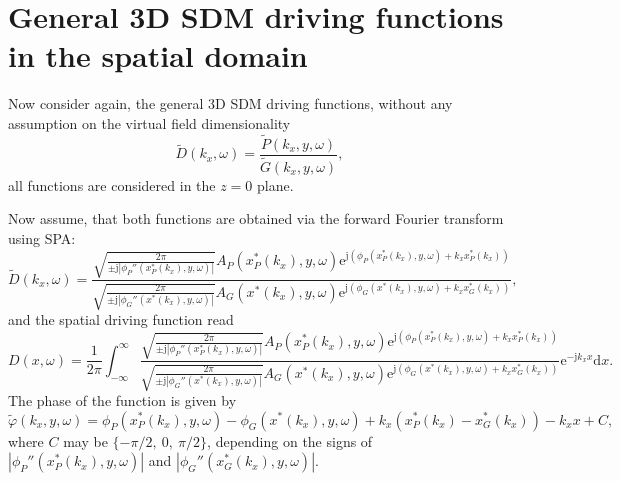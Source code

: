 \documentclass[12pt,a4paper]{article}
\newcommand{\td}{\mathrm{d}}
\newcommand{\te}{\mathrm{e}}
\newcommand{\ti}{\mathrm{j}}
\begin{document}
\section{General 3D SDM driving functions in the spatial domain}

Now consider again, the general 3D SDM driving functions, without any assumption on the virtual field dimensionality
\begin{equation}
\tilde{D}(k_x,\omega) = \frac{\tilde{P}(k_x,y,\omega)}{\tilde{G}(k_x,y,\omega)},
\end{equation}
all functions are considered in the $z=0$ plane.

Now assume, that both functions are obtained via the forward Fourier transform using SPA:
\begin{equation}
\tilde{D}(k_x,\omega) = 
\frac{
\sqrt{\frac{2\pi}{\pm \ti \left|\phi_P''(x_P^*(k_x),y,\omega) \right|}} A_P(x_P^*(k_x),y,\omega) \te^{\ti (\phi_P(x_P^*(k_x),y,\omega)+k_x x_P^*(k_x)) }
}{
\sqrt{\frac{2\pi}{\pm \ti \left|\phi_G''(x^*(k_x),y,\omega) \right|}} A_G(x^*(k_x),y,\omega) \te^{\ti (\phi_G(x^*(k_x),y,\omega)+k_x x_G^*(k_x)) }
},
\end{equation}
and the spatial driving function read
\begin{equation}
D(x,\omega) = 
\frac{1}{2\pi}\int_{-\infty}^{\infty}
\frac{
\sqrt{\frac{2\pi}{\pm \ti \left|\phi_P''(x_P^*(k_x),y,\omega) \right|}} A_P(x_P^*(k_x),y,\omega) \te^{\ti (\phi_P(x_P^*(k_x),y,\omega)+k_x x_P^*(k_x)) }
}{
\sqrt{\frac{2\pi}{\pm \ti \left|\phi_G''(x^*(k_x),y,\omega) \right|}} A_G(x^*(k_x),y,\omega) \te^{\ti (\phi_G(x^*(k_x),y,\omega)+k_x x_G^*(k_x)) }
}
\te^{-\ti k_x x} \td x.
\label{Eq:inv_tr_2}
\end{equation}
The phase of the function is given by
\begin{equation}
\tilde{\varphi}(k_x,y,\omega) = \phi_P(x_P^*(k_x),y,\omega) - \phi_G(x^*(k_x),y,\omega)  + k_x \left( x_P^*(k_x) - x_G^*(k_x) \right) -  k_x x + C,
\end{equation}
where $C$ may be $\{-\pi/2,\ 0,\ \pi/2\}$, depending on the signs of $\left|\phi_P''(x_P^*(k_x),y,\omega) \right|$ and $\left|\phi_G''(x_G^*(k_x),y,\omega) \right|$.
\end{document}

